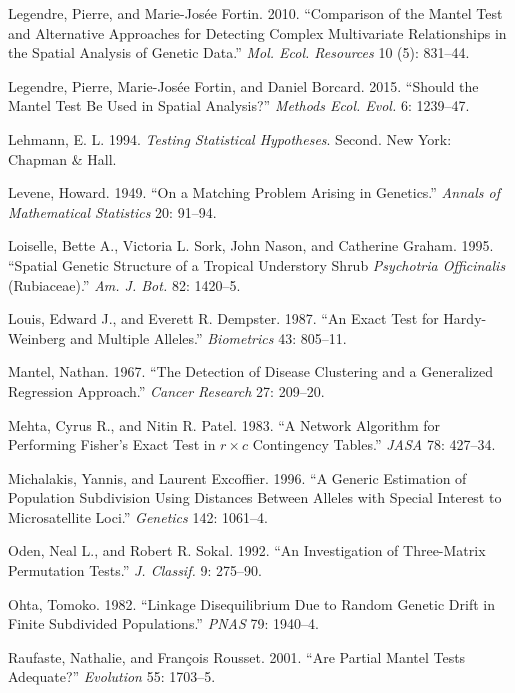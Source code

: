 \documentclass[12pt,]{book}
\begin{document}
\hypertarget{ref-LegendreF10}{}
Legendre, Pierre, and Marie-Josée Fortin. 2010. ``Comparison of the
Mantel Test and Alternative Approaches for Detecting Complex
Multivariate Relationships in the Spatial Analysis of Genetic Data.''
\emph{Mol. Ecol. Resources} 10 (5): 831--44.

\hypertarget{ref-LegendreFB15}{}
Legendre, Pierre, Marie-Josée Fortin, and Daniel Borcard. 2015. ``Should
the Mantel Test Be Used in Spatial Analysis?'' \emph{Methods Ecol.
Evol.} 6: 1239--47.

\hypertarget{ref-Lehmann94test}{}
Lehmann, E. L. 1994. \emph{Testing Statistical Hypotheses}. Second. New
York: Chapman \& Hall.

\hypertarget{ref-Levene49}{}
Levene, Howard. 1949. ``On a Matching Problem Arising in Genetics.''
\emph{Annals of Mathematical Statistics} 20: 91--94.

\hypertarget{ref-LoiselleSNG95}{}
Loiselle, Bette A., Victoria L. Sork, John Nason, and Catherine Graham.
1995. ``Spatial Genetic Structure of a Tropical Understory Shrub
\emph{Psychotria Officinalis} (Rubiaceae).'' \emph{Am. J. Bot.} 82:
1420--5.

\hypertarget{ref-LouisD87}{}
Louis, Edward J., and Everett R. Dempster. 1987. ``An Exact Test for
Hardy-Weinberg and Multiple Alleles.'' \emph{Biometrics} 43: 805--11.

\hypertarget{ref-Mantel67}{}
Mantel, Nathan. 1967. ``The Detection of Disease Clustering and a
Generalized Regression Approach.'' \emph{Cancer Research} 27: 209--20.

\hypertarget{ref-MehtaP83}{}
Mehta, Cyrus R., and Nitin R. Patel. 1983. ``A Network Algorithm for
Performing Fisher's Exact Test in \(r \times
	c\) Contingency Tables.'' \emph{JASA} 78: 427--34.

\hypertarget{ref-MichalakisE96}{}
Michalakis, Yannis, and Laurent Excoffier. 1996. ``A Generic Estimation
of Population Subdivision Using Distances Between Alleles with Special
Interest to Microsatellite Loci.'' \emph{Genetics} 142: 1061--4.

\hypertarget{ref-OdenS92}{}
Oden, Neal L., and Robert R. Sokal. 1992. ``An Investigation of
Three-Matrix Permutation Tests.'' \emph{J. Classif.} 9: 275--90.

\hypertarget{ref-Ohta82p}{}
Ohta, Tomoko. 1982. ``Linkage Disequilibrium Due to Random Genetic Drift
in Finite Subdivided Populations.'' \emph{PNAS} 79: 1940--4.

\hypertarget{ref-RaufasteR01}{}
Raufaste, Nathalie, and François Rousset. 2001. ``Are Partial Mantel
Tests Adequate?'' \emph{Evolution} 55: 1703--5.
\end{document}
